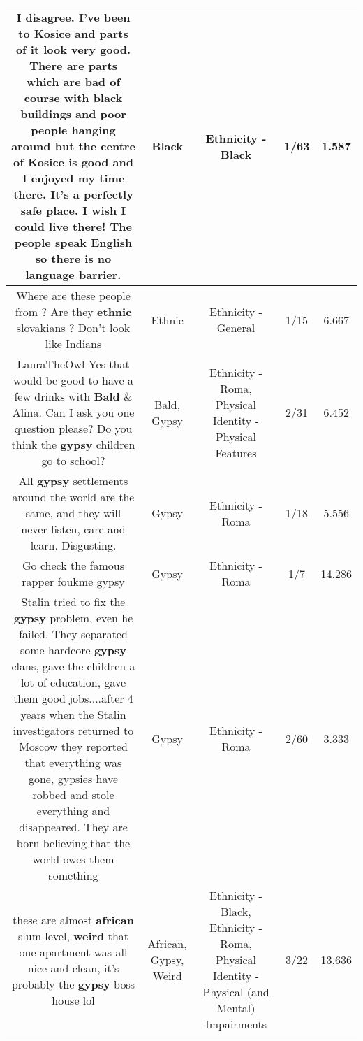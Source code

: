 \documentclass[11pt]{article}
\newlength\mylength
\begin{document}
\begin{center}
\begin{longtable}{|C{.65\mylength}|C{.30\mylength}|C{.12\mylength}|C{.12\mylength}|C{.12\mylength}|}
  \small I disagree. I've been to Kosice and parts of it look very good. There are parts which are bad of course with \textbf{black} buildings and poor people hanging around but the centre of Kosice is good and I enjoyed my time there. It's a perfectly safe place. I wish I could live there! The people speak English so there is no language barrier.\normalsize   & Black & Ethnicity - Black & 1/63 & 1.587 \\  \hline
  \small Where are these people from ? Are they \textbf{ethnic} slovakians ? Don't look like Indians\normalsize   & Ethnic & Ethnicity - General & 1/15 & 6.667 \\  \hline
  \small LauraTheOwl Yes that would be good to have a few drinks with \textbf{Bald} \& Alina. Can I ask you one question please? Do you think the \textbf{gypsy} children go to school?\normalsize   & Bald, Gypsy & Ethnicity - Roma, Physical Identity - Physical Features & 2/31 & 6.452 \\  \hline
  \small All \textbf{gypsy} settlements around the world are the same, and they will never listen, care and learn. Disgusting.\normalsize   & Gypsy & Ethnicity - Roma & 1/18 & 5.556 \\  \hline
  \small Go check the famous rapper foukme gypsy\normalsize   & Gypsy & Ethnicity - Roma & 1/7 & 14.286 \\  \hline
  \small Stalin tried to fix the \textbf{gypsy} problem, even he failed. They separated some hardcore \textbf{gypsy} clans, gave the children a lot of education, gave them good jobs....after 4 years when the Stalin investigators returned to Moscow they reported that everything was gone, gypsies have robbed and stole everything and disappeared. They are born believing that the world owes them something\normalsize   & Gypsy & Ethnicity - Roma & 2/60 & 3.333 \\  \hline
  \small these are almost \textbf{african} slum level, \textbf{weird} that one apartment was all nice and clean, it's probably the \textbf{gypsy} boss house lol\normalsize   & African, Gypsy, Weird & Ethnicity - Black, Ethnicity - Roma, Physical Identity - Physical (and Mental) Impairments & 3/22 & 13.636 \\  \hline

\end{longtable}
\end{center}
\end{document}
